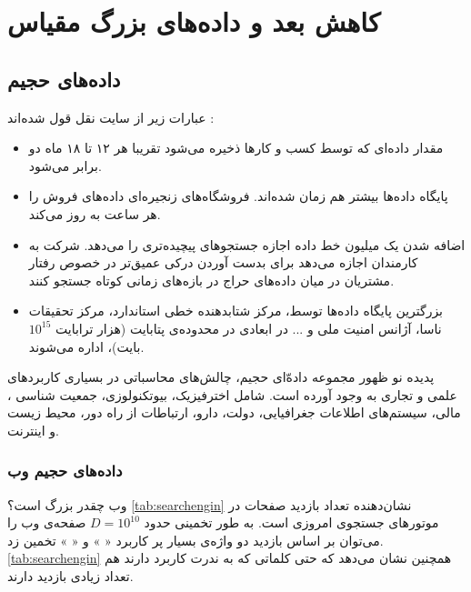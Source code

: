 \chapter{
کاهش بعد و داده‌های بزرگ مقیاس
}

\section{داده‌های حجیم}
عبارات زیر از سایت 
نقل قول شده‌اند
:

\begin{itemize}
\item
مقدار داده‌ای که توسط کسب و کارها ذخیره می‌شود تقریبا هر ۱۲ تا ۱۸ ماه دو برابر می‌شود.
\item
پایگاه داده‌ها بیشتر هم ‌زمان شده‌اند. فروشگاه‌های زنجیره‌ای 
داده‌های فروش را هر ساعت به روز می‌کند.
\item
اضافه شدن یک میلیون خط داده اجازه جستجوهای پیچیده‌تری را می‌دهد. شرکت 
به کارمندان اجازه می‌دهد برای بدست آوردن درکی عمیق‌تر در خصوص رفتار مشتریان در میان داده‌های حراج در بازه‌های زمانی کوتاه جستجو کنند.
\item
بزرگترین پایگاه داده‌ها توسط، مرکز شتابدهنده خطی استاندارد، مرکز تحقیقات ناسا، آژانس امنیت ملی و ... در ابعادی در محدوده‌ی پتابایت (هزار ترابایت 
$10^15$
بایت)، اداره می‌شوند.
\end{itemize}

پدیده نو ظهور مجموعه‌ داده‌ّای حجیم، چالش‌های محاسباتی در بسیاری کاربردهای علمی و تجاری به وجود آورده است. شامل اخترفیزیک، بیوتکنولوزی، جمعیت شناسی
، مالی، سیستم‌های اطلاعات جغرافیایی، دولت، دارو، ارتباطات از راه دور، محیط زیست و اینترنت.

\subsection{داده‌های حجیم وب}

وب چقدر بزرگ است؟  
\autoref{tab:searchengin}
نشان‌دهنده تعداد بازدید صفحات در موتورهای جستجوی امروزی است. به طور تخمینی حدود 
$D = 10^10$
صفحه‌ی وب را می‌توان بر اساس بازدید دو واژه‌ی بسیار پر کاربرد «
» و «
» تخمین زد. 
\autoref{tab:searchengin}
 همچنین نشان می‌دهد که حتی کلماتی که به ندرت کاربرد دارند هم تعداد زیادی بازدید دارند.

